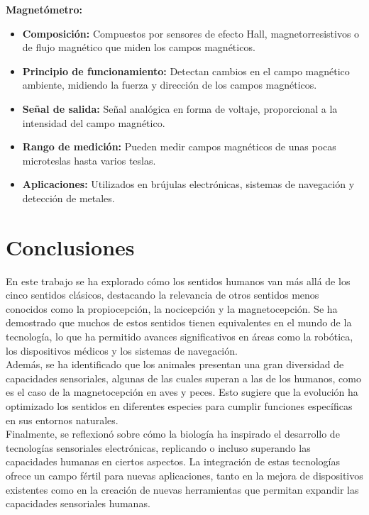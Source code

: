 \documentclass[conference]{IEEEtran}
\begin{document}
\textbf{Magnetómetro:}
\begin{itemize}
    \item \textbf{Composición:} Compuestos por sensores de efecto Hall, magnetorresistivos o de flujo magnético que miden los campos magnéticos.
    \item \textbf{Principio de funcionamiento:} Detectan cambios en el campo magnético ambiente, midiendo la fuerza y dirección de los campos magnéticos.
    \item \textbf{Señal de salida:} Señal analógica en forma de voltaje, proporcional a la intensidad del campo magnético.
    \item \textbf{Rango de medición:} Pueden medir campos magnéticos de unas pocas microteslas hasta varios teslas.
    \item \textbf{Aplicaciones:} Utilizados en brújulas electrónicas, sistemas de navegación y detección de metales.
\end{itemize}

\section{Conclusiones}

En este trabajo se ha explorado cómo los sentidos humanos van más allá de los cinco sentidos clásicos, destacando la relevancia de otros sentidos menos conocidos como la propiocepción, la nocicepción y la magnetocepción. Se ha demostrado que muchos de estos sentidos tienen equivalentes en el mundo de la tecnología, lo que ha permitido avances significativos en áreas como la robótica, los dispositivos médicos y los sistemas de navegación.\\

Además, se ha identificado que los animales presentan una gran diversidad de capacidades sensoriales, algunas de las cuales superan a las de los humanos, como es el caso de la magnetocepción en aves y peces. Esto sugiere que la evolución ha optimizado los sentidos en diferentes especies para cumplir funciones específicas en sus entornos naturales.\\

Finalmente, se reflexionó sobre cómo la biología ha inspirado el desarrollo de tecnologías sensoriales electrónicas, replicando o incluso superando las capacidades humanas en ciertos aspectos. La integración de estas tecnologías ofrece un campo fértil para nuevas aplicaciones, tanto en la mejora de dispositivos existentes como en la creación de nuevas herramientas que permitan expandir las capacidades sensoriales humanas.\\




\end{document}
